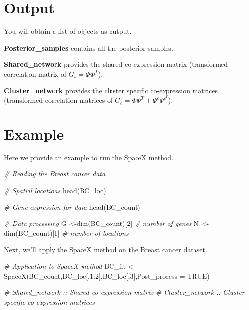 \documentclass[
]{book}
\newenvironment{Shaded}{\begin{snugshade}}{\end{snugshade}}
\newcommand{\AttributeTok}[1]{\textcolor[rgb]{0.77,0.63,0.00}{#1}}
\newcommand{\CommentTok}[1]{\textcolor[rgb]{0.56,0.35,0.01}{\textit{#1}}}
\newcommand{\ConstantTok}[1]{\textcolor[rgb]{0.00,0.00,0.00}{#1}}
\newcommand{\DecValTok}[1]{\textcolor[rgb]{0.00,0.00,0.81}{#1}}
\newcommand{\FunctionTok}[1]{\textcolor[rgb]{0.00,0.00,0.00}{#1}}
\newcommand{\NormalTok}[1]{#1}
\newcommand{\OtherTok}[1]{\textcolor[rgb]{0.56,0.35,0.01}{#1}}
\newcommand{\SpecialCharTok}[1]{\textcolor[rgb]{0.00,0.00,0.00}{#1}}
\begin{document}
\hypertarget{output}{%
\section{Output}\label{output}}

You will obtain a list of objects as output.

\textbf{Posterior\_samples} contains all the posterior samples.

\textbf{Shared\_network} provides the shared co-expression matrix (transformed correlation matrix of \(G_{s} = \Phi \Phi^{T}\)).

\textbf{Cluster\_network} provides the cluster specific co-expression matrices (transformed correlation matrices of \(G_{c} = \Phi \Phi^{T} + \Psi^{c} {\Psi^{c^{T}}}\)).

\hypertarget{example}{%
\section{Example}\label{example}}

Here we provide an example to run the SpaceX method.

\begin{Shaded}
\begin{Highlighting}[]
\CommentTok{\# Reading the Breast cancer data}

\CommentTok{\# Spatial locations}
\FunctionTok{head}\NormalTok{(BC\_loc)}

\CommentTok{\# Gene expression for data}
\FunctionTok{head}\NormalTok{(BC\_count) }

\CommentTok{\# Data processing}
\NormalTok{G }\OtherTok{\textless{}{-}}\FunctionTok{dim}\NormalTok{(BC\_count)[}\DecValTok{2}\NormalTok{] }\CommentTok{\# number of genes}
\NormalTok{N }\OtherTok{\textless{}{-}}\FunctionTok{dim}\NormalTok{(BC\_count)[}\DecValTok{1}\NormalTok{] }\CommentTok{\# number of locations}
\end{Highlighting}
\end{Shaded}

Next, we'll apply the SpaceX method on the Breast cancer dataset.

\begin{Shaded}
\begin{Highlighting}[]
\CommentTok{\# Application to SpaceX method}
\NormalTok{BC\_fit }\OtherTok{\textless{}{-}} \FunctionTok{SpaceX}\NormalTok{(BC\_count,BC\_loc[,}\DecValTok{1}\SpecialCharTok{:}\DecValTok{2}\NormalTok{],BC\_loc[,}\DecValTok{3}\NormalTok{],}\AttributeTok{Post\_process =} \ConstantTok{TRUE}\NormalTok{)}

\CommentTok{\# Shared\_network :: Shared co{-}expression matrix}
\CommentTok{\# Cluster\_network :: Cluster specific co{-}expression matrices}
\end{Highlighting}
\end{Shaded}


  
\end{document}
